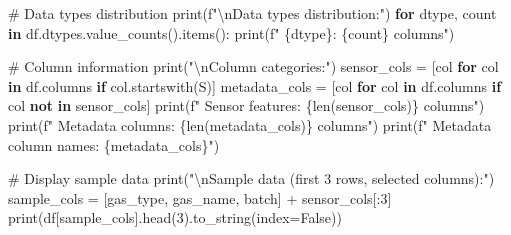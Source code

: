 \documentclass[
  letterpaper,
  DIV=11,
  numbers=noendperiod]{scrartcl}
\newenvironment{Shaded}{\begin{snugshade}}{\end{snugshade}}
\newcommand{\BuiltInTok}[1]{\textcolor[rgb]{0.00,0.23,0.31}{#1}}
\newcommand{\CharTok}[1]{\textcolor[rgb]{0.13,0.47,0.30}{#1}}
\newcommand{\CommentTok}[1]{\textcolor[rgb]{0.37,0.37,0.37}{#1}}
\newcommand{\ControlFlowTok}[1]{\textcolor[rgb]{0.00,0.23,0.31}{\textbf{#1}}}
\newcommand{\DecValTok}[1]{\textcolor[rgb]{0.68,0.00,0.00}{#1}}
\newcommand{\KeywordTok}[1]{\textcolor[rgb]{0.00,0.23,0.31}{\textbf{#1}}}
\newcommand{\NormalTok}[1]{\textcolor[rgb]{0.00,0.23,0.31}{#1}}
\newcommand{\OperatorTok}[1]{\textcolor[rgb]{0.37,0.37,0.37}{#1}}
\newcommand{\SpecialCharTok}[1]{\textcolor[rgb]{0.37,0.37,0.37}{#1}}
\newcommand{\SpecialStringTok}[1]{\textcolor[rgb]{0.13,0.47,0.30}{#1}}
\newcommand{\StringTok}[1]{\textcolor[rgb]{0.13,0.47,0.30}{#1}}
\newcommand{\VariableTok}[1]{\textcolor[rgb]{0.07,0.07,0.07}{#1}}
\renewenvironment{Shaded}{%
  \begin{tcolorbox}[%
    enhanced,%
    colback=codebg,%
    colframe=codebg,%
    borderline west={3pt}{0pt}{sectionblue},%
    fontupper=\small\ttfamily,%
    boxrule=0pt,%
    arc=0pt,%
    boxsep=5pt,%
    left=2mm,%
    right=2mm,%
    top=2mm,%
    bottom=2mm%
  ]%
}{%
  \end{tcolorbox}%
}
\begin{document}
\begin{Shaded}
\begin{Highlighting}[]
\CommentTok{\# Data types distribution}
\BuiltInTok{print}\NormalTok{(}\SpecialStringTok{f"}\CharTok{\textbackslash{}n}\SpecialStringTok{Data types distribution:"}\NormalTok{)}
\ControlFlowTok{for}\NormalTok{ dtype, count }\KeywordTok{in}\NormalTok{ df.dtypes.value\_counts().items():}
    \BuiltInTok{print}\NormalTok{(}\SpecialStringTok{f"  }\SpecialCharTok{\{}\NormalTok{dtype}\SpecialCharTok{\}}\SpecialStringTok{: }\SpecialCharTok{\{}\NormalTok{count}\SpecialCharTok{\}}\SpecialStringTok{ columns"}\NormalTok{)}

\CommentTok{\# Column information}
\BuiltInTok{print}\NormalTok{(}\StringTok{"}\CharTok{\textbackslash{}n}\StringTok{Column categories:"}\NormalTok{)}
\NormalTok{sensor\_cols }\OperatorTok{=}\NormalTok{ [col }\ControlFlowTok{for}\NormalTok{ col }\KeywordTok{in}\NormalTok{ df.columns }\ControlFlowTok{if}\NormalTok{ col.startswith(}\StringTok{\textquotesingle{}S\textquotesingle{}}\NormalTok{)]}
\NormalTok{metadata\_cols }\OperatorTok{=}\NormalTok{ [col }\ControlFlowTok{for}\NormalTok{ col }\KeywordTok{in}\NormalTok{ df.columns }\ControlFlowTok{if}\NormalTok{ col }\KeywordTok{not} \KeywordTok{in}\NormalTok{ sensor\_cols]}
\BuiltInTok{print}\NormalTok{(}\SpecialStringTok{f"  Sensor features: }\SpecialCharTok{\{}\BuiltInTok{len}\NormalTok{(sensor\_cols)}\SpecialCharTok{\}}\SpecialStringTok{ columns"}\NormalTok{)}
\BuiltInTok{print}\NormalTok{(}\SpecialStringTok{f"  Metadata columns: }\SpecialCharTok{\{}\BuiltInTok{len}\NormalTok{(metadata\_cols)}\SpecialCharTok{\}}\SpecialStringTok{ columns"}\NormalTok{)}
\BuiltInTok{print}\NormalTok{(}\SpecialStringTok{f"  Metadata column names: }\SpecialCharTok{\{}\NormalTok{metadata\_cols}\SpecialCharTok{\}}\SpecialStringTok{"}\NormalTok{)}

\CommentTok{\# Display sample data}
\BuiltInTok{print}\NormalTok{(}\StringTok{"}\CharTok{\textbackslash{}n}\StringTok{Sample data (first 3 rows, selected columns):"}\NormalTok{)}
\NormalTok{sample\_cols }\OperatorTok{=}\NormalTok{ [}\StringTok{\textquotesingle{}gas\_type\textquotesingle{}}\NormalTok{, }\StringTok{\textquotesingle{}gas\_name\textquotesingle{}}\NormalTok{, }\StringTok{\textquotesingle{}batch\textquotesingle{}}\NormalTok{] }\OperatorTok{+}\NormalTok{ sensor\_cols[:}\DecValTok{3}\NormalTok{]}
\BuiltInTok{print}\NormalTok{(df[sample\_cols].head(}\DecValTok{3}\NormalTok{).to\_string(index}\OperatorTok{=}\VariableTok{False}\NormalTok{))}
\end{Highlighting}
\end{Shaded}
\end{document}
